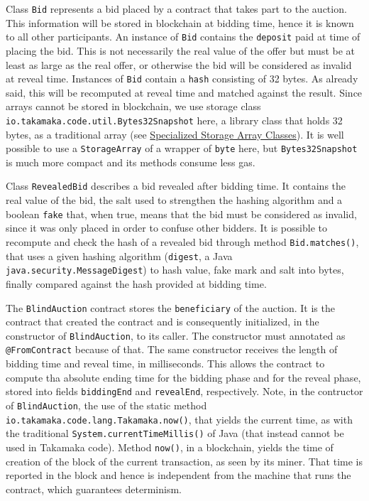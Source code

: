 \documentclass[a4paper,]{book}
\begin{document}
{Class \texttt{Bid} represents a bid placed by a contract that takes part
to the auction. This information will be stored in blockchain at bidding
time, hence it is known to all other participants. An instance of
\texttt{Bid} contains the \texttt{deposit} paid at time of placing the
bid. This is not necessarily the real value of the offer but must be at
least as large as the real offer, or otherwise the bid will be
considered as invalid at reveal time. Instances of \texttt{Bid} contain
a \texttt{hash} consisting of 32 bytes. As already said, this will be
recomputed at reveal time and matched against the result. Since arrays
cannot be stored in blockchain, we use storage class
\texttt{io.takamaka.code.util.Bytes32Snapshot} here, a library class
that holds 32 bytes, as a traditional array (see
\protect\hyperlink{specialized-storage-array-classes}{Specialized
Storage Array Classes}). It is well possible to use a
\texttt{StorageArray} of a wrapper of \texttt{byte} here, but
\texttt{Bytes32Snapshot} is much more compact and its methods consume
less gas.

Class \texttt{RevealedBid} describes a bid revealed after bidding time.
It contains the real value of the bid, the salt used to strengthen the
hashing algorithm and a boolean \texttt{fake} that, when true, means
that the bid must be considered as invalid, since it was only placed in
order to confuse other bidders. It is possible to recompute and check
the hash of a revealed bid through method \texttt{Bid.matches()}, that
uses a given hashing algorithm (\texttt{digest}, a Java
\texttt{java.security.MessageDigest}) to hash value, fake mark and salt
into bytes, finally compared against the hash provided at bidding time.

The \texttt{BlindAuction} contract stores the \texttt{beneficiary} of
the auction. It is the contract that created the contract and is
consequently initialized, in the constructor of \texttt{BlindAuction},
to its caller. The constructor must annotated as \texttt{@FromContract}
because of that. The same constructor receives the length of bidding
time and reveal time, in milliseconds. This allows the contract to
compute tha absolute ending time for the bidding phase and for the
reveal phase, stored into fields \texttt{biddingEnd} and
\texttt{revealEnd}, respectively. Note, in the contructor of
\texttt{BlindAuction}, the use of the static method
\texttt{io.takamaka.code.lang.Takamaka.now()}, that yields the current
time, as with the traditional \texttt{System.currentTimeMillis()} of
Java (that instead cannot be used in Takamaka code). Method
\texttt{now()}, in a blockchain, yields the time of creation of the
block of the current transaction, as seen by its miner. That time is
reported in the block and hence is independent from the machine that
runs the contract, which guarantees determinism.

}
\end{document}
